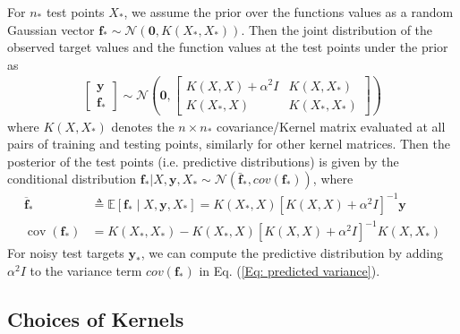 For $n_\ast$ test points $X_\ast$, we assume the prior over the functions values as a random Gaussian vector $\mathbf{f}_\ast \sim \mathcal{N}(\mathbf{0}, K(X_\ast, X_\ast))$.
Then the joint distribution of the observed target values and the function values at the test points under the prior as 
\begin{align}
    \left[\begin{array}{l}\mathbf{y} \\ \mathbf{f}_{*}\end{array}\right] \sim \mathcal{N}\left(\mathbf{0},\left[\begin{array}{cc}K(X, X)+\alpha^{2} I & K\left(X, X_{*}\right) \\ K\left(X_{*}, X\right) & K\left(X_{*}, X_{*}\right)\end{array}\right]\right)
\end{align}
where $K(X, X_\ast)$ denotes the $n \times n_\ast$ covariance/Kernel matrix evaluated at all pairs of training and testing points, similarly for other kernel matrices.
Then the posterior of the test points (i.e. predictive distributions) is given by the conditional distribution $\mathbf{f}_\ast | X, \mathbf{y}, X_\ast \sim \mathcal{N}(\bar{\mathbf{f}}_\ast, cov(\mathbf{f}_\ast))$, where
\begin{align}
   \overline{\mathbf{f}}_{*} & \triangleq \mathbb{E}\left[\mathbf{f}_{*} \mid X, \mathbf{y}, X_{*}\right]=K\left(X_{*}, X\right)\left[K(X, X)+\alpha^{2} I\right]^{-1} \mathbf{y} \\
   \label{Eq: predicted variance}
   \operatorname{cov}\left(\mathbf{f}_{*}\right) &=K\left(X_{*}, X_{*}\right)-K\left(X_{*}, X\right)\left[K(X, X)+\alpha^{2} I\right]^{-1} K\left(X, X_{*}\right) 
\end{align}
For noisy test targets $\mathbf{y}_\ast$, we can compute the predictive distribution by adding $\alpha^2 I$ to the variance term $cov(\mathbf{f}_\ast)$ in Eq. (\ref{Eq: predicted variance}).



\subsection{Choices of Kernels}

